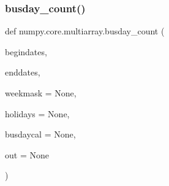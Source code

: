\subsubsection{\texorpdfstring{busday\+\_\+count()}{busday\_count()}}
{\footnotesize\ttfamily def numpy.\+core.\+multiarray.\+busday\+\_\+count (\begin{DoxyParamCaption}\item[{}]{begindates,  }\item[{}]{enddates,  }\item[{}]{weekmask = {\ttfamily None},  }\item[{}]{holidays = {\ttfamily None},  }\item[{}]{busdaycal = {\ttfamily None},  }\item[{}]{out = {\ttfamily None} }\end{DoxyParamCaption})}

